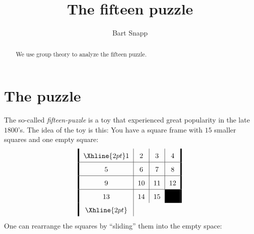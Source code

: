 \documentclass{ximera}
\author{Bart Snapp}
\title{The fifteen puzzle}
\begin{document}
\begin{abstract}
  We use group theory to analyze the fifteen puzzle.
\end{abstract}
\maketitle


\section{The puzzle}

The so-called \textit{fifteen-puzzle} is a toy that experienced great
popularity in the late $1800$'s. The idea of the toy is this: You
have a square frame with $15$ smaller squares and one empty square:
\[
\arraycolsep=6pt\def\arraystretch{1.6}
\begin{array}{!{\vline width 2pt}c|c|c|c!{\vline width 2pt}}
    \Xhline{2pt}
    1  & 2  & 3  & 4 \\ \hline
    5  & 6  & 7  & 8 \\ \hline
    9  & 10 & 11 & 12 \\ \hline
    13 & 14 & 15 & \cellcolor{black}\\%
    \Xhline{2pt}
\end{array}
\]
One can rearrange the squares by ``sliding'' them into the empty
space:
\end{document}
